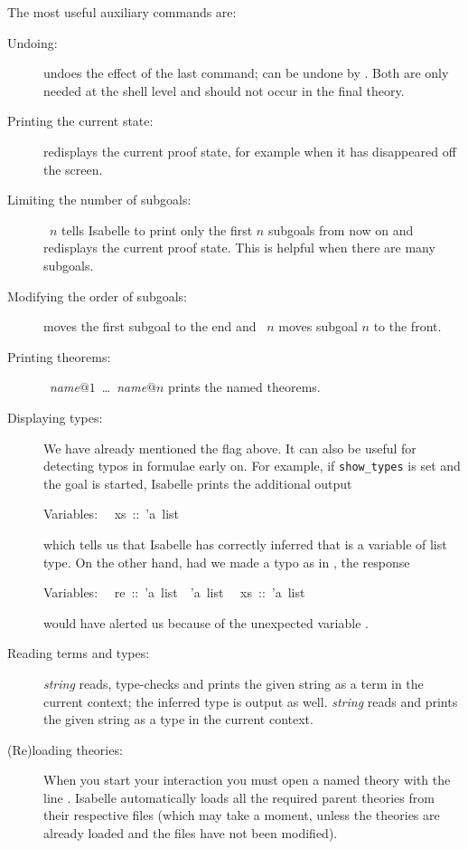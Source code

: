 The most useful auxiliary commands are:
\begin{description}
\item[Undoing:]  undoes the effect of the
  last command;  can be undone by
  .  Both are only needed at the shell
  level and should not occur in the final theory.
\item[Printing the current state:]  redisplays
  the current proof state, for example when it has disappeared off the
  screen.
\item[Limiting the number of subgoals:] ~$n$ tells Isabelle to
  print only the first $n$ subgoals from now on and redisplays the current
  proof state. This is helpful when there are many subgoals.
\item[Modifying the order of subgoals:]
 moves the first subgoal to the end and
~$n$ moves subgoal $n$ to the front.
\item[Printing theorems:]
  ~\textit{name}$@1$~\dots~\textit{name}$@n$
  prints the named theorems.
\item[Displaying types:] We have already mentioned the flag
   above. It can also be useful for detecting typos in
  formulae early on. For example, if \texttt{show_types} is set and the goal
   is started, Isabelle prints the additional output
\par\noindent
\begin{isabelle}%
Variables:\isanewline
~~xs~::~'a~list
\end{isabelle}%
\par\noindent
which tells us that Isabelle has correctly inferred that
 is a variable of list type. On the other hand, had we
made a typo as in , the response
\par\noindent
\begin{isabelle}%
Variables:\isanewline
~~re~::~'a~list~{\isasymRightarrow}~'a~list\isanewline
~~xs~::~'a~list%
\end{isabelle}%
\par\noindent
would have alerted us because of the unexpected variable .
\item[Reading terms and types:] 
  \textit{string} reads, type-checks and prints the given string as a term in
  the current context; the inferred type is output as well.
   \textit{string} reads and prints the given
  string as a type in the current context.
\item[(Re)loading theories:] When you start your interaction you must open a
  named theory with the line . Isabelle
  automatically loads all the required parent theories from their respective
  files (which may take a moment, unless the theories are already loaded and
  the files have not been modified).
  

\end{description}
